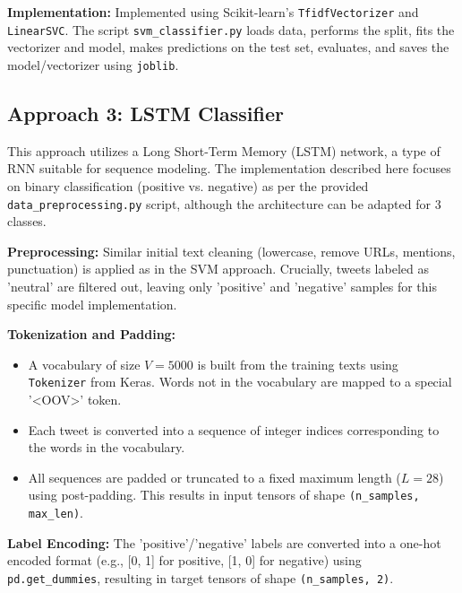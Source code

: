 \documentclass[10pt,twocolumn]{article}
\begin{document}
\textbf{Implementation:} Implemented using Scikit-learn's \texttt{TfidfVectorizer} and \texttt{LinearSVC}. The script \texttt{svm\_classifier.py} loads data, performs the split, fits the vectorizer and model, makes predictions on the test set, evaluates, and saves the model/vectorizer using \texttt{joblib}. %

\subsection{Approach 3: LSTM Classifier}
\label{subsec:sol_lstm}

This approach utilizes a Long Short-Term Memory (LSTM) network, a type of RNN suitable for sequence modeling. The implementation described here focuses on binary classification (positive vs. negative) as per the provided \texttt{data\_preprocessing.py} script, although the architecture can be adapted for 3 classes. %

\textbf{Preprocessing:} Similar initial text cleaning (lowercase, remove URLs, mentions, punctuation) is applied as in the SVM approach. Crucially, tweets labeled as 'neutral' are filtered out, leaving only 'positive' and 'negative' samples for this specific model implementation.

\textbf{Tokenization and Padding:}
\begin{itemize}[itemsep=0pt, topsep=3pt]
    \item A vocabulary of size $V=5000$ is built from the training texts using \texttt{Tokenizer} from Keras. Words not in the vocabulary are mapped to a special '<OOV>' token.
    \item Each tweet is converted into a sequence of integer indices corresponding to the words in the vocabulary.
    \item All sequences are padded or truncated to a fixed maximum length ($L=28$) using post-padding. This results in input tensors of shape \texttt{(n\_samples, max\_len)}. %
\end{itemize}

\textbf{Label Encoding:} The 'positive'/'negative' labels are converted into a one-hot encoded format (e.g., [0, 1] for positive, [1, 0] for negative) using \texttt{pd.get\_dummies}, resulting in target tensors of shape \texttt{(n\_samples, 2)}. %
\end{document}
